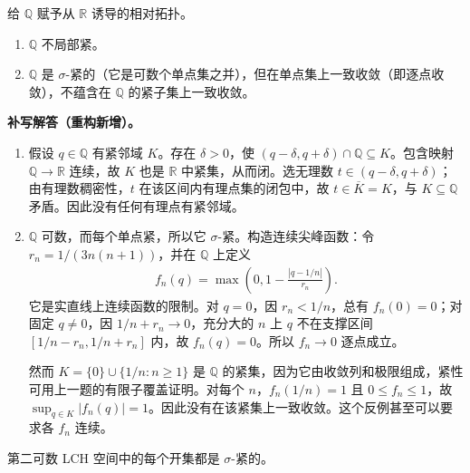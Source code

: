 \documentclass[../../main.tex]{subfiles}%
\begin{document}
\begin{exercise}\label{exercise:ch04-rationals-locally-compact}
给 $\mathbb Q$ 赋予从 $\mathbb R$ 诱导的相对拓扑。
\begin{enumerate}
\item\label{item:ch04-rationals-not-locally-compact} $\mathbb Q$ 不局部紧。
\item\label{item:ch04-rationals-compact-convergence} $\mathbb Q$ 是 $\sigma$-紧的（它是可数个单点集之并），但在单点集上一致收敛（即逐点收敛），不蕴含在 $\mathbb Q$ 的紧子集上一致收敛。
\end{enumerate}
\end{exercise}
\begin{solution}
\textbf{补写解答（重构新增）。}
\begin{enumerate}
\item 假设 $q\in\mathbb Q$ 有紧邻域 $K$。存在 $\delta>0$，使 $(q-\delta,q+\delta)\cap\mathbb Q\subseteq K$。包含映射 $\mathbb Q\to\mathbb R$ 连续，故 $K$ 也是 $\mathbb R$ 中紧集，从而闭。选无理数 $t\in(q-\delta,q+\delta)$；由有理数稠密性，$t$ 在该区间内有理点集的闭包中，故 $t\in\overline K=K$，与 $K\subseteq\mathbb Q$ 矛盾。因此没有任何有理点有紧邻域。
\item $\mathbb Q$ 可数，而每个单点紧，所以它 $\sigma$-紧。构造连续尖峰函数：令 $r_n=1/(3n(n+1))$，并在 $\mathbb Q$ 上定义
\begin{align*}
f_n(q)=\max\left(0,1-\frac{|q-1/n|}{r_n}\right).
\end{align*}
它是实直线上连续函数的限制。对 $q=0$，因 $r_n<1/n$，总有 $f_n(0)=0$；对固定 $q\ne0$，因 $1/n+r_n\to0$，充分大的 $n$ 上 $q$ 不在支撑区间 $[1/n-r_n,1/n+r_n]$ 内，故 $f_n(q)=0$。所以 $f_n\to0$ 逐点成立。

然而 $K=\{0\}\cup\{1/n:n\ge1\}$ 是 $\mathbb Q$ 的紧集，因为它由收敛列和极限组成，紧性可用上一题的有限子覆盖证明。对每个 $n$，$f_n(1/n)=1$ 且 $0\le f_n\le1$，故 $\sup_{q\in K}|f_n(q)|=1$。因此没有在该紧集上一致收敛。这个反例甚至可以要求各 $f_n$ 连续。
\end{enumerate}
\end{solution}
\begin{exercise}\label{exercise:ch04-second-countable-sigma-compact}
第二可数 LCH 空间中的每个开集都是 $\sigma$-紧的。
\end{exercise}
\end{document}

